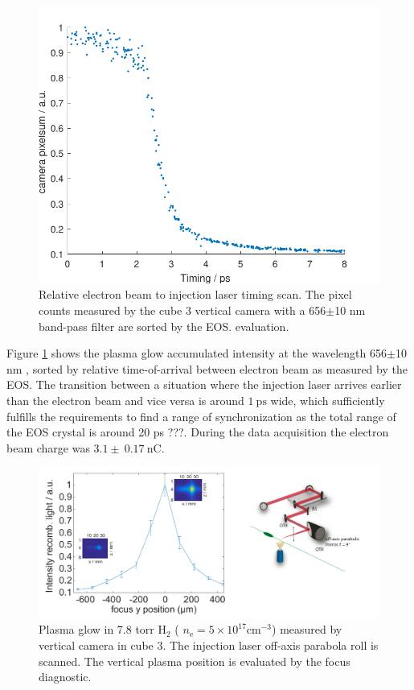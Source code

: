\begin{figure}[htbp]
\center
\includegraphics[width=1\textwidth]{experiment/images/raw/PlasmaGlow_20384_scatter.pdf}
\caption{Relative electron beam to injection laser timing scan. The pixel counts measured by the cube 3 vertical camera with a 656$\pm$10 nm  band-pass filter are sorted by the EOS. evaluation.}
\label{img:PlasmaGlowTimingOAP_H2He}
\end{figure}

Figure \ref{img:PlasmaGlowTimingOAP_H2He} shows the plasma glow accumulated intensity at the wavelength 656$\pm$10 nm , sorted by relative time-of-arrival between electron beam as measured by the EOS. The transition between a situation where the injection laser arrives earlier than the electron beam and vice versa is around $1\ \mathrm{ps}$ wide, which sufficiently fulfills the requirements to find a range of synchronization as the total range of the EOS crystal is around 20 ps ???.
During the data acquisition the electron beam charge was $3.1\pm \ 0.17\ \mathrm{nC}$. 

\begin{figure}[htbp]
\center
\includegraphics[width=1.0\textwidth]{experiment/images/edited/Plasma_Glow_roll.pdf}
\caption{Plasma glow in 7.8 torr $\mathrm{H}_2$ ( $n_\mathrm{e}=5\times10^{17}\mathrm{cm}^{-3} $) measured by vertical camera in cube 3. The injection laser off-axis parabola roll is scanned. The vertical plasma position is evaluated by the focus diagnostic.}
\label{img:PlasmaGlowRoll}
\end{figure}


